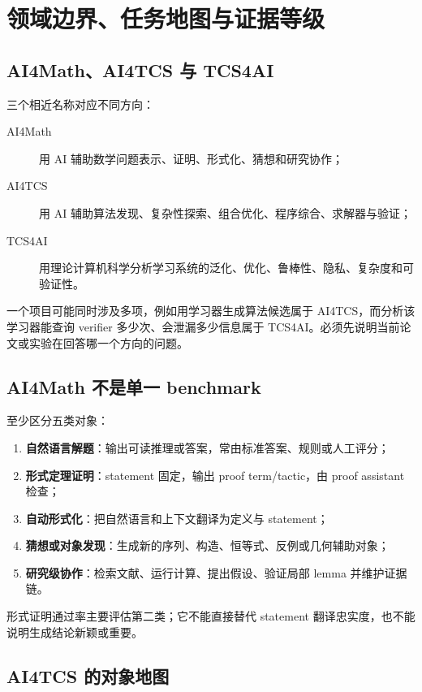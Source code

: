 \chapter{领域边界、任务地图与证据等级}

\section{AI4Math、AI4TCS 与 TCS4AI}

三个相近名称对应不同方向：
\begin{description}
  \item[AI4Math] 用 AI 辅助数学问题表示、证明、形式化、猜想和研究协作；
  \item[AI4TCS] 用 AI 辅助算法发现、复杂性探索、组合优化、程序综合、求解器与验证；
  \item[TCS4AI] 用理论计算机科学分析学习系统的泛化、优化、鲁棒性、隐私、复杂度和可验证性。
\end{description}
一个项目可能同时涉及多项，例如用学习器生成算法候选属于 AI4TCS，而分析该学习器能查询 verifier 多少次、会泄漏多少信息属于 TCS4AI。必须先说明当前论文或实验在回答哪一个方向的问题。

\section{AI4Math 不是单一 benchmark}

至少区分五类对象：
\begin{enumerate}
  \item \textbf{自然语言解题}：输出可读推理或答案，常由标准答案、规则或人工评分；
  \item \textbf{形式定理证明}：statement 固定，输出 proof term/tactic，由 proof assistant 检查；
  \item \textbf{自动形式化}：把自然语言和上下文翻译为定义与 statement；
  \item \textbf{猜想或对象发现}：生成新的序列、构造、恒等式、反例或几何辅助对象；
  \item \textbf{研究级协作}：检索文献、运行计算、提出假设、验证局部 lemma 并维护证据链。
\end{enumerate}

形式证明通过率主要评估第二类；它不能直接替代 statement 翻译忠实度，也不能说明生成结论新颖或重要。

\section{AI4TCS 的对象地图}

